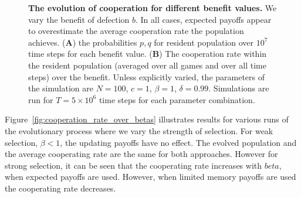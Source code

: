 \documentclass[11pt]{article}
\theoremstyle{plainCl1}
\theoremstyle{plainCl2}
\begin{document}
\begin{figure}[!htbp]
\begin{subfigure}{.5\textwidth}
  \end{subfigure}
  \caption{{\bf The evolution of cooperation for different benefit values.} 
  We vary the benefit of defection $b$. In all cases, expected payoffs appear to
  overestimate the average cooperation rate the population achieves. ({\bf A})
  the probabilities \(p, q\) for resident population over \(10^7\) time steps
  for each benefit value. ({\bf B}) The cooperation rate within the resident population
  (averaged over all games and over all time steps) over the benefit.
  Unless
  explicitly varied, the parameters of the simulation are $N\!=\!100$,
  $c\!=\!1$, $\beta\!=\!1$, $\delta\!=\!0.99$. Simulations are run
  for $T\!=\!5\times 10^6$ time steps for each parameter
  combination.}\label{fig:cooperation_rate_over_benefit}
\end{figure}

Figure~\ref{fig:cooperation_rate_over_betas} illustrates results for various
runs of the evolutionary process where we vary the strength of selection. For
weak selection, \(\beta < 1\), the updating payoffs have no effect. The evolved
population and the average cooperating rate are the same for both approaches.
However for strong selection, it can be seen that the cooperating rate increases
with \(beta\), when expected payoffs are used. However, when limited memory
payoffs are used the cooperating rate decreases.
\end{document}
